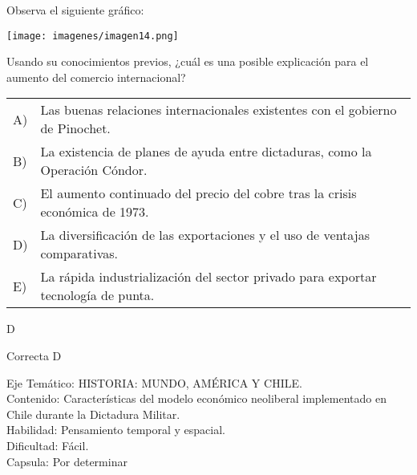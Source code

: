 \documentclass[letterpaper,11pt]{article}
\newcommand{\anchopregunta}{0.9\textwidth}
\begin{document}
\begin{enumerate}
\begin{minipage}{\anchopregunta}
\item Observa el siguiente gráfico:
\begin{center}
\texttt{[image: imagenes/imagen14.png]}
\end{center}
Usando su conocimientos previos, ¿cuál es una posible explicación para el aumento del comercio internacional?
\begin{flushleft}\begin{tabular}{@{\hspace{-.001\textwidth}}l@{\hspace{2pt}}p{}}
A)& Las buenas relaciones internacionales existentes con el gobierno de Pinochet.\\
B)& La existencia de planes de ayuda entre dictaduras, como la Operación Cóndor.\\
C)& El aumento continuado del precio del cobre tras la crisis económica de 1973.\\
D)& La diversificación de las exportaciones y el uso de ventajas comparativas.\\
E)& La rápida industrialización del sector privado para exportar tecnología de punta.\\ 
\end{tabular}\end{flushleft}%
\begin{key} D
\end{key} 
\begin{hint}
\end{hint}
\begin{answer} Correcta D\
\end{answer}
\begin{info} %
\begin{flushleft}
Eje Temático: HISTORIA: MUNDO, AMÉRICA Y CHILE.\\
Contenido: Características del modelo económico neoliberal implementado en Chile durante la Dictadura Militar.\\
Habilidad: Pensamiento temporal y espacial.\\
Dificultad: Fácil.\\
Capsula: Por determinar \\
\end{flushleft} 
\end{info}
\end{minipage}\vfill$\;$ %


\end{enumerate}
\end{document}
